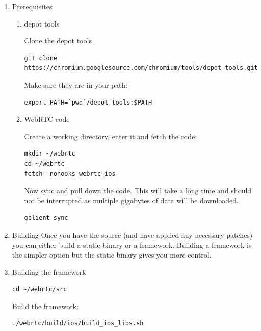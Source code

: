 \documentclass[a4paper,11pt]{article}
\begin{document}
\begin{enumerate}
\item Prerequisites
\label{sec:org6aeca14}
\begin{enumerate}
\item depot tools
\label{sec:orgfcb5068}

Clone the depot tools

\begin{verbatim}
git clone https://chromium.googlesource.com/chromium/tools/depot_tools.git
\end{verbatim}

Make sure they are in your path:

\begin{verbatim}
export PATH=`pwd`/depot_tools:$PATH
\end{verbatim}

\item WebRTC code
\label{sec:org7cf5cac}

Create a working directory, enter it and fetch the code:

\begin{verbatim}
mkdir ~/webrtc
cd ~/webrtc
fetch —nohooks webrtc_ios
\end{verbatim}

Now sync and pull down the code.  This will take a long time and
should not be interrupted as multiple gigabytes of data will be
downloaded.

\begin{verbatim}
gclient sync
\end{verbatim}
\end{enumerate}

\item Building
\label{sec:org4613ee4}
\label{orgb90e33c} Once you have the source (and have applied any
necessary patches) you can either build a static binary or a
framework.  Building a framework is the simpler option but the static
binary gives you more control.


\item Building the framework
\label{sec:org1750310}

\begin{verbatim}
cd ~/webrtc/src
\end{verbatim}

Build the framework:

\begin{verbatim}
./webrtc/build/ios/build_ios_libs.sh
\end{verbatim}


\end{enumerate}
\end{document}
